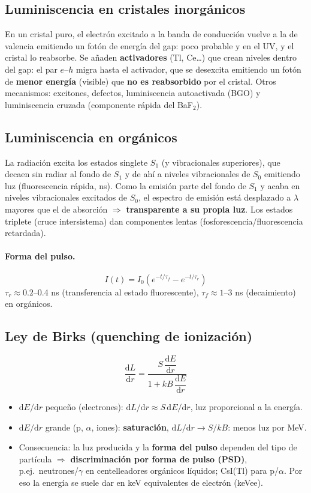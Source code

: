 \subsection{Luminiscencia en cristales inorgánicos}
En un cristal puro, el electrón excitado a la banda de conducción vuelve a la de valencia emitiendo un fotón de energía del gap:
poco probable y en el UV, y el cristal lo reabsorbe. Se añaden \textbf{activadores} (Tl, Ce\dots) que crean niveles dentro del gap:
el par $e$--$h$ migra hasta el activador, que se desexcita emitiendo un fotón de \textbf{menor energía} (visible) que
\textbf{no es reabsorbido} por el cristal. Otros mecanismos: excitones, defectos, luminiscencia autoactivada (BGO) y
luminiscencia cruzada (componente rápida del BaF$_2$).

\subsection{Luminiscencia en orgánicos}
La radiación excita los estados singlete $S_1$ (y vibracionales superiores), que decaen sin radiar al fondo de $S_1$ y de ahí a niveles
vibracionales de $S_0$ emitiendo luz (fluorescencia rápida, ns). Como la emisión parte del fondo de $S_1$ y acaba en niveles
vibracionales excitados de $S_0$, el espectro de emisión está desplazado a $\lambda$ mayores que el de absorción
$\Rightarrow$ \textbf{transparente a su propia luz}. Los estados triplete (cruce intersistema) dan componentes lentas (fosforescencia/fluorescencia retardada).

\paragraph{Forma del pulso.}
\[ I(t)=I_0\left(e^{-t/\tau_f}-e^{-t/\tau_r}\right) \]
$\tau_r\approx0.2$--0.4 ns (transferencia al estado fluorescente), $\tau_f\approx1$--3 ns (decaimiento) en orgánicos.

\subsection{Ley de Birks (quenching de ionización)}
\begin{clave}
\[
\frac{\mathrm{d}L}{\mathrm{d}r}=\frac{S\,\dfrac{\mathrm{d}E}{\mathrm{d}r}}{1+kB\,\dfrac{\mathrm{d}E}{\mathrm{d}r}}
\]
\begin{itemize}
\item $\mathrm{d}E/\mathrm{d}r$ pequeño (electrones): $\mathrm{d}L/\mathrm{d}r\approx S\,\mathrm{d}E/\mathrm{d}r$, luz proporcional a la energía.
\item $\mathrm{d}E/\mathrm{d}r$ grande (p, $\alpha$, iones): \textbf{saturación}, $\mathrm{d}L/\mathrm{d}r\to S/kB$: menos luz por MeV.
\item Consecuencia: la luz producida y la \textbf{forma del pulso} dependen del tipo de partícula $\Rightarrow$
\textbf{discriminación por forma de pulso (PSD)}, p.ej.\ neutrones/$\gamma$ en centelleadores orgánicos líquidos; CsI(Tl) para p/$\alpha$.
Por eso la energía se suele dar en keV equivalentes de electrón (keVee).
\end{itemize}
\end{clave}

